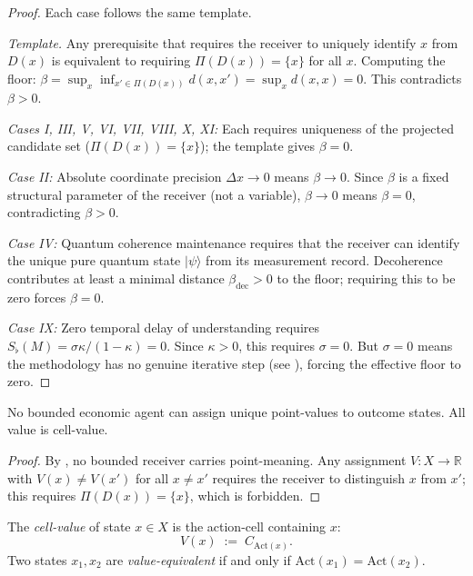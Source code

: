 \documentclass[twocolumn,11pt,a4paper]{article}
\newcommand{\R}{\mathbb{R}}
\newcommand{\Sfloor}{S_{\flat}}
\newcommand{\Action}{\mathrm{Act}}
\begin{document}
\begin{proof}
Each case follows the same template.

\textit{Template.}  Any prerequisite that requires the receiver to
uniquely identify $x$ from $D(x)$ is equivalent to requiring
$\Pi(D(x))=\{x\}$ for all $x$.  Computing the floor:
$\beta=\sup_{x}\inf_{x'\in\Pi(D(x))}d(x,x')=\sup_{x}d(x,x)=0$.
This contradicts $\beta>0$.

\textit{Cases I, III, V, VI, VII, VIII, X, XI:} Each requires uniqueness
of the projected candidate set ($\Pi(D(x))=\{x\}$); the template gives
$\beta=0$.

\textit{Case II:}  Absolute coordinate precision $\Delta x\to 0$ means
$\beta\to 0$.  Since $\beta$ is a fixed structural parameter of the
receiver (not a variable), $\beta\to 0$ means $\beta=0$, contradicting
$\beta>0$.

\textit{Case IV:}  Quantum coherence maintenance requires that the
receiver can identify the unique pure quantum state $|\psi\rangle$ from
its measurement record.  Decoherence contributes at least a minimal
distance $\beta_{\mathrm{dec}}>0$ to the floor; requiring this to be
zero forces $\beta=0$.

\textit{Case IX:}  Zero temporal delay of understanding requires
$\Sfloor(M)=\sigma\kappa/(1-\kappa)=0$.  Since $\kappa>0$, this requires
$\sigma=0$.  But $\sigma=0$ means the methodology has no genuine
iterative step (see ), forcing the effective
floor to zero.
\end{proof}

\begin{corollary}
\label{cor:pointvalueforbidden}
No bounded economic agent can assign unique point-values to outcome
states.  All value is cell-value.
\end{corollary}

\begin{proof}
By , no bounded receiver carries point-meaning.
Any assignment $V\colon X\to\R$ with $V(x)\neq V(x')$ for all $x\neq x'$
requires the receiver to distinguish $x$ from $x'$; this requires
$\Pi(D(x))=\{x\}$, which is forbidden.
\end{proof}

\begin{definition}
\label{def:cellvalue}
The \emph{cell-value} of state $x\in X$ is the action-cell containing $x$:
\[
  V(x)\;:=\;C_{\Action(x)}.
\]
Two states $x_1,x_2$ are \emph{value-equivalent} if and only if
$\Action(x_1)=\Action(x_2)$.
\end{definition}
\end{document}
